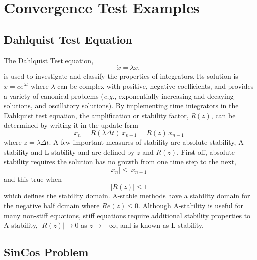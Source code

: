 
\section{Convergence Test Examples}


\subsection{Dahlquist Test Equation\label{rythmos:sec:Dahlquist-Test}}

The Dahlquist Test equation,
\begin{equation}
\dot{x}=\lambda x,\label{rymthos:eq:Dahlquist-Test}
\end{equation}
is used to investigate and classify the properties of integrators.
Its solution is $x=ce^{\lambda t}$ where $\lambda$ can be complex
with positive, negative coefficients, and provides a variety of canonical
problems (\emph{e.g.}, exponentially increasing and decaying solutions,
and oscillatory solutions). By implementing time integrators in the
Dahlquist test equation, the amplification or stability factor, $R(z)$,
can be determined by writing it in the update form
\[
x_{n}=R(\lambda\Delta t)\, x_{n-1}=R(z)\, x_{n-1}
\]
where $z=\lambda\Delta t$. A few important measures of stability
are absolute stability, A-stability and L-stability and are defined
by $z$ and $R(z)$. First off, absolute stability requires the solution
has no growth from one time step to the next, 
\[
\left|x_{n}\right|\leq\left|x_{n-1}\right|
\]
and this true when
\[
\left|R(z)\right|\leq1
\]
which defines the stability domain. A-stable methods have a stability
domain for the negative half domain where $Re(z)\leq0$. Although
A-stability is useful for many non-stiff equations, stiff equations
require additional stability properties to A-stability, $\left|R(z)\right|\rightarrow0$
as $z\rightarrow-\infty$, and is known as L-stability.


\subsection{SinCos Problem\label{rythmos:sec:SinCos-Problem}}

